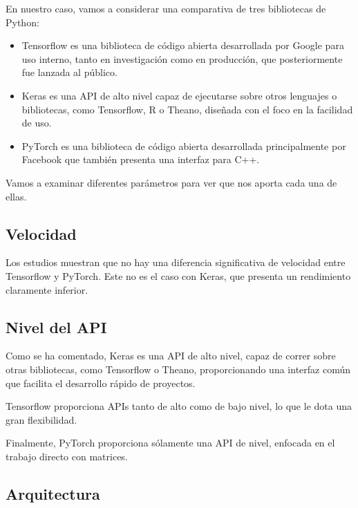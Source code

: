 En nuestro caso, vamos a considerar una comparativa de tres bibliotecas de Python:

\begin{itemize}
	\itemsep1pt\parskip0pt
	\item
	Tensorflow es una biblioteca de código abierta desarrollada por Google
	para uso interno, tanto en investigación como en producción, que
	posteriormente fue lanzada al público.\\
	\item
	Keras es una API de alto nivel capaz de ejecutarse sobre otros
	lenguajes o bibliotecas, como Tensorflow, R o Theano, diseñada con el
	foco en la facilidad de uso.\\
	\item
	PyTorch es una biblioteca de código abierta desarrollada principalmente
	por Facebook que también presenta una interfaz para C++.
\end{itemize}

Vamos a examinar diferentes parámetros para ver que nos aporta cada una
de ellas.

\subsection{Velocidad}\label{velocidad}

Los estudios muestran que no hay una diferencia significativa de
velocidad entre Tensorflow y PyTorch. Este no es el caso con Keras, que
presenta un rendimiento claramente inferior.

\subsection{Nivel del API}\label{nivel-del-api}

Como se ha comentado, Keras es una API de alto nivel, capaz de correr
sobre otras bibliotecas, como Tensorflow o Theano, proporcionando una
interfaz común que facilita el desarrollo rápido de proyectos.

Tensorflow proporciona APIs tanto de alto como de bajo nivel, lo que le
dota una gran flexibilidad.

Finalmente, PyTorch proporciona sólamente una API de nivel, enfocada en
el trabajo directo con matrices.

\subsection{Arquitectura}\label{arquitectura}

